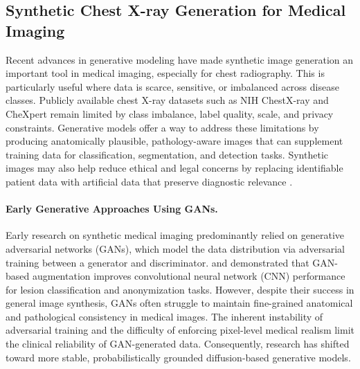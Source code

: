 
\subsection{Synthetic Chest X-ray Generation for Medical Imaging}

Recent advances in generative modeling have made synthetic image generation an important tool in medical imaging, especially for chest radiography. 
This is particularly useful where data is scarce, sensitive, or imbalanced across disease classes. 
Publicly available chest X-ray datasets such as NIH ChestX-ray \citep{wang2017chestxray8} and CheXpert \citep{Chexpert} remain limited by class imbalance, label quality, scale, and privacy constraints. 
Generative models offer a way to address these limitations by producing anatomically plausible, pathology-aware images that can supplement training data for classification, segmentation, and detection tasks. 
Synthetic images may also help reduce ethical and legal concerns by replacing identifiable patient data with artificial data that preserve diagnostic relevance \citep{generative_ai_medical_imaging_2025}. 

\paragraph{Early Generative Approaches Using GANs.}
Early research on synthetic medical imaging predominantly relied on generative adversarial networks (GANs), which model the data distribution via adversarial training between a generator and discriminator. \citet{gan_medical_image_augmentation_2018} and \citet{medical_image_synthesis_gans_2018} demonstrated that GAN-based augmentation improves convolutional neural network (CNN) performance for lesion classification and anonymization tasks. However, despite their success in general image synthesis, GANs often struggle to maintain fine-grained anatomical and pathological consistency in medical images. The inherent instability of adversarial training and the difficulty of enforcing pixel-level medical realism limit the clinical reliability of GAN-generated data. Consequently, research has shifted toward more stable, probabilistically grounded diffusion-based generative models.

